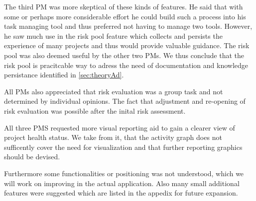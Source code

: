 The third PM was more skeptical of these kinds of features. He said that with some or perhaps more considerable effort he could build such a process into his task managing tool and thus preferred not having to manage two tools. However, he saw much use in the risk pool feature which collects and persists the experience of many projects and thus would provide valuable guidance. The risk pool was also deemed useful by the other two PMs. We thus conclude that the risk pool is pracitcable way to adress the need of documentation and knowledge persistance identified in \ref{sec:theoryAd}.

All PMs also appreciated that risk evaluation was a group task and not determined by individual opinions. The fact that adjustment and re-opening of risk evaluation was possible after the inital risk assessment.

All three PMS requested more visual reporting aid to gain a clearer view of project health status. We take from it, that the activity graph does not sufficently cover the need for visualization and that further reporting graphics should be devised.

Furthermore some functionalities or positioning was not understood, which we will work on improving in the actual application. Also many small additional features were suggested which are listed in the appedix for future expansion.
